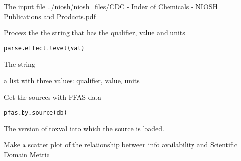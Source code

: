 \documentclass[letterpaper]{book}
\begin{document}
%
\begin{Arguments}
\begin{ldescription}
\item[\code{infile}] The input file ../niosh/niosh\_files/CDC - Index of Chemicals - NIOSH Publications and Products.pdf
\end{ldescription}
\end{Arguments}
%
\begin{Description}\relax
Process the the string that has the qualifier, value and units
\end{Description}
%
\begin{Usage}
\begin{verbatim}
parse.effect.level(val)
\end{verbatim}
\end{Usage}
%
\begin{Arguments}
\begin{ldescription}
\item[\code{val}] The string
\end{ldescription}
\end{Arguments}
%
\begin{Value}
a list with three values: qualifier, value, units
\end{Value}
%
\begin{Description}\relax
Get the sources with PFAS data
\end{Description}
%
\begin{Usage}
\begin{verbatim}
pfas.by.source(db)
\end{verbatim}
\end{Usage}
%
\begin{Arguments}
\begin{ldescription}
\item[\code{db}] The version of toxval into which the source is loaded.
\end{ldescription}
\end{Arguments}
%
\begin{Description}\relax
Make a scatter plot of the relationship between info availability and Scientific Domain Metric
\end{Description}
\end{document}
